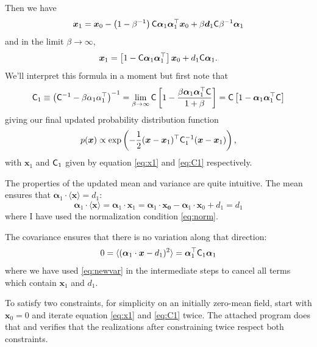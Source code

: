 \documentclass[11pt,a4paper,preprint]{aastex}
\newcommand{\bmath}[1]{\ensuremath{\bm{#1}}}
\renewcommand{\vec}[1]{\bmath{#1}}
\newcommand{\tens}[1]{{\bf \sf #1}}
\begin{document}
Then we have
\begin{equation}
\vec{x}_1 = \vec{x}_0 - \left(1-\beta^{-1}\right) \tens{C}
\vec{\alpha}_1 \vec{\alpha}_1^{\top} \vec{x}_0 + \beta \vec{d}_1
\tens{C} \beta^{-1} \vec{\alpha}_1
\end{equation}
and in the limit $\beta \to \infty$,
\begin{equation}
\vec{x}_1 = \left[1-\tens{C} \vec{\alpha}_1 \vec{\alpha}_1^{\top}
\right] \vec{x}_0 + d_1 \tens{C} \vec{\alpha}_1\textrm{.}\label{eq:x1}
\end{equation}
We'll interpret this formula in a moment but first note that
\begin{equation}
\tens{C}_1 \equiv \left(\tens{C}^{-1} - \beta \alpha_1
  \alpha_1^{\top}\right)^{-1} = \lim_{\beta \to \infty} \tens{C}
\left[1-\frac{\beta \vec{\alpha}_1 \vec{\alpha}_1^{\top}
    \tens{C}}{1+\beta} \right] = \tens{C}
\left[1- \vec{\alpha}_1 \vec{\alpha}_1^{\top}
    \tens{C} \right]\label{eq:C1}
\end{equation}
giving our final updated probability distribution function
\begin{equation}
p(\vec{x}) \propto \exp \left(-\frac{1}{2} (\vec{x} -
  \vec{x}_1)^{\top} \tens{C}_1^{-1} (\vec{x}-\vec{x}_1) \right)\textrm{,}
\end{equation}
with $\vec{x}_1$ and $\tens{C}_1$ given by equation \eqref{eq:x1} and
\eqref{eq:C1} respectively.

The properties of the updated mean and variance are quite
intuitive. The mean ensures that $\vec{\alpha}_1 \cdot \langle \vec{x}
\rangle = d_1$:
\begin{equation}
\vec{\alpha}_1 \cdot \langle \vec{x} \rangle = \vec{\alpha}_1 \cdot
\vec{x}_1 = \vec{\alpha}_1 \cdot \vec{x_0} - \vec{\alpha}_1 \cdot
\vec{x}_0 + d_1 = d_1
\label{eq:newvar}
\end{equation}
where I have used the normalization condition \eqref{eq:norm}.

The covariance ensures that there is no variation along that
direction:
\begin{equation}
0=\langle (\vec{\alpha}_1 \cdot \vec{x}-d_1)^2 \rangle =%
\vec{\alpha}_1^{\top}\tens{C}_1 \vec{\alpha}_1 %
\end{equation}
where we have used \eqref{eq:newvar} in the intermediate steps to cancel all terms which contain $\vec{x}_1$ and $d_1$.

To satisfy two constraints, for simplicity on an initially zero-mean
field, start with $\vec{x}_0=0$ and iterate equation \eqref{eq:x1} and
\eqref{eq:C1} twice. The attached program does that and verifies that
the realizations after constraining twice respect both constraints.
\end{document}
